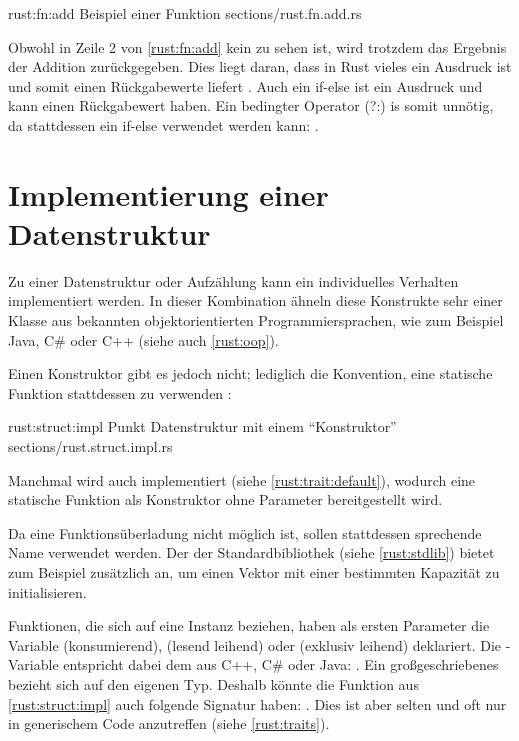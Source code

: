 \rustcinclude
	{rust:fn:add}
	{Beispiel einer Funktion}
	{sections/rust.fn.add.rs}
	
Obwohl in Zeile 2 von \autoref{rust:fn:add} kein  zu sehen ist, wird trotzdem das Ergebnis der Addition zurückgegeben.
Dies liegt daran, dass in Rust vieles ein Ausdruck ist und somit einen Rückgabewerte liefert \cite{rust:book:statements}.
Auch ein if-else ist ein Ausdruck und kann einen Rückgabewert haben.
Ein bedingter Operator (?:) is somit unnötig, da stattdessen ein if-else verwendet werden kann: .



\section{Implementierung einer Datenstruktur}

Zu einer Datenstruktur oder Aufzählung kann ein individuelles Verhalten implementiert werden.
In dieser Kombination ähneln diese Konstrukte sehr einer Klasse aus bekannten objektorientierten Programmiersprachen, wie zum Beispiel Java, C\# oder C++ (siehe auch \autoref{rust:oop}).

Einen Konstruktor gibt es jedoch nicht; lediglich die Konvention, eine statische Funktion  stattdessen zu verwenden \cite{rust:book:constructors}:

\rustcinclude
	{rust:struct:impl}
	{Punkt Datenstruktur mit einem \enquote{Konstruktor}}
	{sections/rust.struct.impl.rs}
	
Manchmal wird auch  implementiert (siehe \autoref{rust:trait:default}), wodurch eine statische Funktion  als Konstruktor ohne Parameter bereitgestellt wird.

Da eine Funktionsüberladung nicht möglich ist, sollen stattdessen sprechende Name verwendet werden.
Der  der Standardbibliothek (siehe \autoref{rust:stdlib}) bietet zum Beispiel zusätzlich  an, um einen Vektor mit einer bestimmten Kapazität zu initialisieren.

Funktionen, die sich auf eine Instanz beziehen, haben als ersten Parameter die Variable  (konsumierend),  (lesend leihend) oder  (exklusiv leihend) deklariert.
Die -Variable entspricht dabei dem  aus C++, C\# oder Java:
.
Ein großgeschriebenes  bezieht sich auf den eigenen Typ. Deshalb könnte die Funktion aus \autoref{rust:struct:impl} auch folgende Signatur haben: .
Dies ist aber selten und oft nur in generischem Code anzutreffen (siehe \autoref{rust:traits}).

